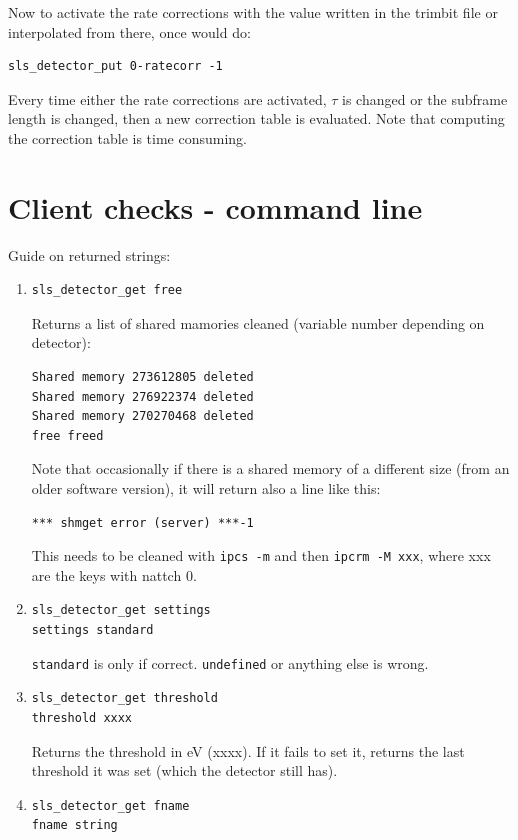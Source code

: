 \documentclass{article}
\begin{document}
 Now to activate the rate corrections with the value written in the trimbit file or interpolated from there, once would do: 
\begin{verbatim}
sls_detector_put 0-ratecorr -1
\end{verbatim}

Every time either the rate corrections are activated, $\tau$ is changed or the subframe length is changed, then a new correction table is evaluated. Note that computing the correction table is time consuming. 

\section{Client checks - command line}

Guide on returned strings:
\begin{enumerate}
\item \begin{verbatim}
sls_detector_get free
\end{verbatim}
Returns a list of shared mamories cleaned (variable number depending on detector):
\begin{verbatim}
Shared memory 273612805 deleted
Shared memory 276922374 deleted
Shared memory 270270468 deleted
free freed
\end{verbatim}
Note that occasionally if there is a shared memory of a different size (from an older software version), it will return also a line like this:
\begin{verbatim}
*** shmget error (server) ***-1
\end{verbatim}
This needs to be cleaned with {\tt{ipcs -m}} and then {\tt{ipcrm -M xxx}}, where xxx are the keys with nattch 0. 
\item \begin{verbatim}sls_detector_get settings
settings standard
\end{verbatim} 
{\tt{standard}} is only if correct. {\tt{undefined}} or anything else is wrong. 

\item \begin{verbatim}
sls_detector_get threshold
threshold xxxx
\end{verbatim}
Returns the threshold in eV (xxxx). If it fails to set it, returns the last threshold it was set (which the detector still has). 

\item \begin{verbatim}
sls_detector_get fname
fname string
\end{verbatim}


\end{enumerate}
\end{document}
